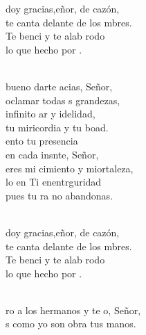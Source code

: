 \documentclass[12pt]{article}
\begin{document}
\begin{multicols*}{2}
\begin{cancion}%
	\begin{chorus}%
	 doy gracias,eñor, de cazón,\\
	te canta delante de los mbres. \\
	Te benci y te alab rodo \\
	lo que  hecho por . \\
	\end{chorus}%
	\jump\\
	 bueno darte acias, Señor,\\
	oclamar todas s grandezas,\\
	 infinito ar y idelidad,\\
	tu miricordia y tu boad.\\
\jump
	ento tu presencia \\
	en cada insnte, Señor,\\
	eres mi cimiento y miortaleza,\\
	lo en Ti enentrguridad\\
	pues tu ra no abandonas. \\\jump\\
	\begin{chorus}%
	 doy gracias,eñor, de cazón,\\
	te canta delante de los mbres. \\
	Te benci y te alab rodo \\
	lo que  hecho por . \\
	\end{chorus}%
	\jump\\
	ro a los hermanos y te o, Señor,\\
	s como yo son obra  tus manos.\\

\end{cancion}
\end{multicols*}
\end{document}
